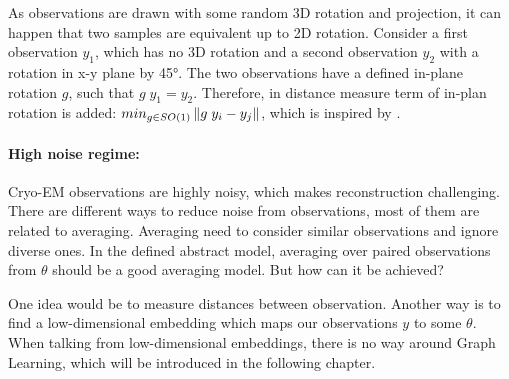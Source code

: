 As observations are drawn with some random 3D rotation and projection, 
it can happen that two samples are equivalent up to 2D rotation. 
Consider a first observation $y_1$, which has no 3D rotation and 
a second observation $y_2$ with a rotation in x-y plane by 45°.
The two observations have a defined in-plane rotation $g$, such that $g \; y_1 = y_2$.
Therefore, in distance measure term of in-plan rotation is added: $min_{g \in SO(1)}\left\lVert g \;y_i - y_j\right\rVert$, 
which is inspired by \cite{multiDiffusionMaps}. 


\paragraph{High noise regime:}
Cryo-EM observations are highly noisy, which makes reconstruction challenging. 
There are different ways to reduce noise from observations, most of them are related to averaging. 
Averaging need to consider similar observations and ignore diverse ones. 
In the defined abstract model, averaging over paired observations from $\theta$ should be a good averaging model.
But how can it be achieved? 

One idea would be to measure distances between observation.
Another way is to find a low-dimensional embedding which maps our observations $y$ to some $\theta$.
When talking from low-dimensional embeddings, there is no way around Graph Learning, which will be introduced
in the following chapter.

